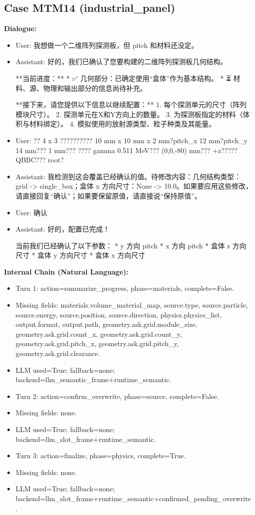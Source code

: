 \documentclass[11pt]{ctexart}
\begin{document}
\subsection{Case MTM14 (industrial\_panel)}
\textbf{Dialogue:}
\begin{itemize}
\item User: 我想做一个二维阵列探测板，但 pitch 和材料还没定。
\item Assistant: 好的，我们已确认了您要构建的二维阵列探测板几何结构。

**当前进度：**
*   ✅ 几何部分：已确定使用“盒体”作为基本结构。
*   ⏳ 材料、源、物理和输出部分的信息尚待补充。

**接下来，请您提供以下信息以继续配置：**
1.  每个探测单元的尺寸（阵列模块尺寸）。
2.  探测单元在X和Y方向上的数量。
3.  为探测板指定的材料（体积与材料绑定）。
4.  模拟使用的放射源类型、粒子种类及其能量。
\item User: ?? 4 x 3 ?????????? 10 mm x 10 mm x 2 mm?pitch\_x 12 mm?pitch\_y 14 mm??? 1 mm??? ???? gamma 0.511 MeV??? (0,0,-80) mm??? +z????? QBBC??? root?
\item Assistant: 我检测到这会覆盖已经确认的值。待修改内容：几何结构类型：grid -> single\_box；盒体 x 方向尺寸：None -> 10.0。如果要应用这些修改，请直接回复“确认”；如果要保留原值，请直接说“保持原值”。
\item User: 确认
\item Assistant: 好的，配置已完成！

当前我们已经确认了以下参数：
*   y 方向 pitch
*   x 方向 pitch
*   盒体 z 方向尺寸
*   盒体 y 方向尺寸
*   盒体 x 方向尺寸
\end{itemize}
\textbf{Internal Chain (Natural Language):}
\begin{itemize}
\item Turn 1: action=summarize\_progress, phase=materials, complete=False.
\item Missing fields: materials.volume\_material\_map, source.type, source.particle, source.energy, source.position, source.direction, physics.physics\_list, output.format, output.path, geometry.ask.grid.module\_size, geometry.ask.grid.count\_x, geometry.ask.grid.count\_y, geometry.ask.grid.pitch\_x, geometry.ask.grid.pitch\_y, geometry.ask.grid.clearance.
\item LLM used=True; fallback=none; backend=llm\_semantic\_frame+runtime\_semantic.
\item Turn 2: action=confirm\_overwrite, phase=source, complete=False.
\item Missing fields: none.
\item LLM used=True; fallback=none; backend=llm\_slot\_frame+runtime\_semantic.
\item Turn 3: action=finalize, phase=physics, complete=True.
\item Missing fields: none.
\item LLM used=True; fallback=none; backend=llm\_slot\_frame+runtime\_semantic+confirmed\_pending\_overwrite.
\end{itemize}
\end{document}
